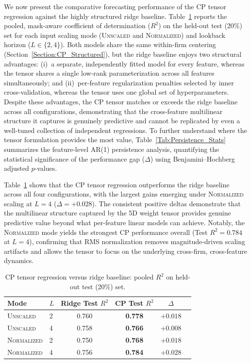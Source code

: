 \documentclass[pdflatex,sn-mathphys-num]{sn-jnl}%
\theoremstyle{thmstyleone}%
\theoremstyle{thmstyletwo}%
\theoremstyle{thmstylethree}%
\begin{document}
We now present the comparative forecasting performance of the CP tensor regression against the highly structured ridge baseline. Table~\ref{Tab:CP_Ridge_Results} reports the pooled, mask-aware coefficient of determination ($R^2$) on the held-out test (20\%) set for each input scaling mode (\textsc{Unscaled} and \textsc{Normalized}) and lookback horizon ($L \in \{2, 4\}$). Both models share the same within-firm centering (Section~\ref{Section:CP_Structured}), but the ridge baseline enjoys two structural advantages: (i)~a separate, independently fitted model for every feature, whereas the tensor shares a single low-rank parameterization across all features simultaneously; and (ii)~per-feature regularization penalties selected by inner cross-validation, whereas the tensor uses one global set of hyperparameters. Despite these advantages, the CP tensor matches or exceeds the ridge baseline across all configurations, demonstrating that the cross-feature multilinear structure it captures is genuinely predictive and cannot be replicated by even a well-tuned collection of independent regressions. To further understand where the tensor formulation provides the most value, Table~\ref{Tab:Persistence_Stats} summarizes the feature-level AR(1) persistence analysis, quantifying the statistical significance of the performance gap ($\Delta$) using Benjamini--Hochberg adjusted $p$-values.

Table~\ref{Tab:CP_Ridge_Results} shows that the CP tensor regression outperforms the ridge baseline across all four configurations, with the largest gains emerging under \textsc{Normalized} scaling at $L=4$ ($\Delta = +0.028$). The consistent positive deltas demonstrate that the multilinear structure captured by the 5D weight tensor provides genuine predictive value beyond what per-feature linear models can achieve. Notably, the \textsc{Normalized} mode yields the strongest CP performance overall (Test $R^2 = 0.784$ at $L=4$), confirming that RMS normalization removes magnitude-driven scaling artifacts and allows the tensor to focus on the underlying cross-firm, cross-feature dynamics.

\begin{table}[!htbp]
\centering
\caption{CP tensor regression versus ridge baseline: pooled $R^2$ on held-out test (20\%) set.}
\label{Tab:CP_Ridge_Results}
\begin{tabular}{llcccc}
\toprule
Mode & $L$ & Ridge Test $R^2$ & CP Test $R^2$ & $\Delta$ \\
\midrule
\textsc{Unscaled}   & 2 & 0.760 & \textbf{0.778} & $+0.018$ \\
\textsc{Unscaled}   & 4 & 0.758 & \textbf{0.766} & $+0.008$ \\
\textsc{Normalized} & 2 & 0.750 & \textbf{0.768} & $+0.018$ \\
\textsc{Normalized} & 4 & 0.756 & \textbf{0.784} & $+0.028$ \\
\bottomrule
\end{tabular}
\end{table}
\end{document}

